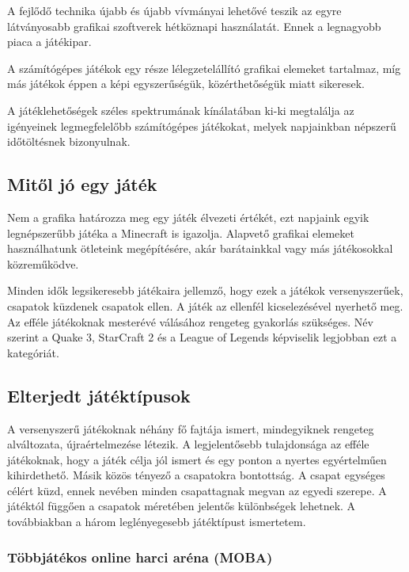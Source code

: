 \documentclass[]{article}
\begin{document}
A fejlődő technika újabb és újabb vívmányai lehetővé teszik az egyre
látványosabb grafikai szoftverek hétköznapi használatát. Ennek a
legnagyobb piaca a játékipar.

A számítógépes játékok egy része lélegzetelállító grafikai elemeket
tartalmaz, míg más játékok éppen a képi egyszerűségük, közérthetőségük
miatt sikeresek.

A játéklehetőségek széles spektrumának kínálatában ki-ki megtalálja az
igényeinek legmegfelelőbb számítógépes játékokat, melyek napjainkban
népszerű időtöltésnek bizonyulnak.

\hypertarget{mitux151l-juxf3-egy-juxe1tuxe9k}{%
\subsection{ Mitől jó egy játék}\label{mitux151l-juxf3-egy-juxe1tuxe9k}}

Nem a grafika határozza meg egy játék élvezeti értékét, ezt napjaink
egyik legnépszerűbb játéka a Minecraft is igazolja. Alapvető grafikai
elemeket használhatunk ötleteink megépítésére, akár barátainkkal vagy
más játékosokkal közreműködve.

Minden idők legsikeresebb játékaira jellemző, hogy ezek a játékok
versenyszerűek, csapatok küzdenek csapatok ellen. A játék az ellenfél
kicselezésével nyerhető meg. Az efféle játékoknak mesterévé válásához
rengeteg gyakorlás szükséges. Név szerint a Quake 3, StarCraft 2 és a
League of Legends képviselik legjobban ezt a kategóriát.

\hypertarget{elterjedt-juxe1tuxe9ktuxedpusok}{%
\subsection{Elterjedt
játéktípusok}\label{elterjedt-juxe1tuxe9ktuxedpusok}}

A versenyszerű játékoknak néhány fő fajtája ismert, mindegyiknek
rengeteg alváltozata, újraértelmezése létezik. A legjelentősebb
tulajdonsága az efféle játékoknak, hogy a játék célja jól ismert és egy
ponton a nyertes egyértelműen kihirdethető. Másik közös tényező a
csapatokra bontottság. A csapat egységes célért küzd, ennek nevében
minden csapattagnak megvan az egyedi szerepe. A játéktól függően a
csapatok méretében jelentős különbségek lehetnek. A továbbiakban a három
leglényegesebb játéktípust ismertetem.

\hypertarget{tuxf6bbjuxe1tuxe9kos-online-harci-aruxe9na-moba}{%
\subsubsection{Többjátékos online harci aréna
(MOBA)}\label{tuxf6bbjuxe1tuxe9kos-online-harci-aruxe9na-moba}}
\end{document}
